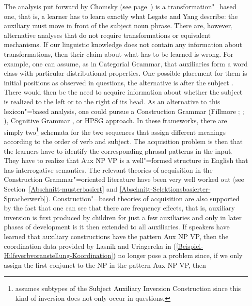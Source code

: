 \noindent
The analysis put forward by Chomsky (see page~\pageref{Seite-GB-Entscheidungsfragen-Englisch}) is a transformation"=based one, that is, a learner
has to learn exactly what Legate and Yang describe: the auxiliary must move in front of the subject noun phrase. There are, however, alternative analyses that
do not require transformations or equivalent mechanisms.
If our linguistic knowledge does not contain any information about transformations, then their claim about what has to be learned is wrong.
For example, one can assume, as in Categorial Grammar, that auxiliaries form a word class with particular distributional properties.
One possible placement for them is initial positions as observed in questions, the alternative is after the subject \citep[]{Villavicencio2002a}.
There would then be the need to acquire information about whether the subject is realized to the
left or to the right of its head. As an alternative to this lexicon"=based analysis,
one could pursue a Construction Grammar (Fillmore \citeyear[]{Fillmore88a};
\citeyear{Fillmore99a}; \citealp[]{KF99a}), Cognitive Grammar \citep[Chapter~9]{Dabrowska2004a}, or HPSG\indexhpsg \citep{GSag2000a-u} approach.
In these frameworks, there are simply two\footnote{
	\citet{Fillmore99a} assumes subtypes of the Subject Auxiliary Inversion Construction since this kind of inversion does not
	only occur in questions.
}
schemata for the two sequences that assign different meanings according to the order of verb and subject. The acquisition problem is then that the learners have
to identify the corresponding phrasal patterns in the input. They have to realize that Aux NP VP is a well"=formed structure in English that has interrogative
semantics.
The relevant theories of acquisition in the Construction Grammar"=oriented literature have been very well worked out (see Section~\ref{Abschnitt-musterbasiert} and
\ref{Abschnitt-Selektionsbasierter-Spracherwerb}). Construction"=based theories of acquisition are also supported by the fact that one can see that there are
frequency effects, that is, auxiliary inversion is first produced by children for just a few auxiliaries and only in later phases of development is it then extended to
all auxiliaries. If speakers have learned that auxiliary constructions have the pattern Aux NP VP, then the coordination data provided by Lasnik and Uriagereka in 
(\ref{Beispiel-Hilfsverbvoranstellung-Koordination}) no longer pose a problem since, if we only assign the first conjunct to the NP in the pattern Aux NP VP, then

